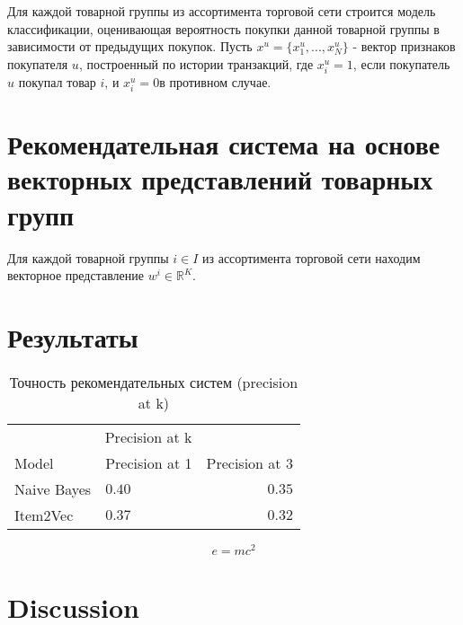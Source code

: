 \documentclass{article}
\begin{document}
Для каждой товарной группы из ассортимента торговой сети строится модель классификации, оценивающая вероятность покупки данной товарной группы в зависимости от предыдущих покупок.
Пусть $x^{u} = \{x^{u}_{1}, ..., x^{u}_{N}\}$ - вектор признаков покупателя $u$, построенный по истории транзакций, где $x^{u}_{i} = 1$, если покупатель $u$ покупал товар $i$, и $x^{u}_{i} = 0$в противном случае.


\section{Рекомендательная система на основе векторных представлений товарных групп}

Для каждой товарной группы $i \in I$ из ассортимента торговой сети находим векторное представление $w^{i} \in \mathbb{R}^{K}$.



\section{Результаты}

\begin{table}
\caption{Точность рекомендательных систем (precision at k)}
\centering
\begin{tabular}{llr}
\toprule
\multicolumn{2}{r}{Precision at k} \\
\cmidrule(r){1-3}
Model & Precision at 1 & Precision at 3 \\
\midrule
Naive Bayes & $0.40$ & $0.35$ \\
Item2Vec & $0.37$ & $0.32$ \\
\bottomrule
\end{tabular}
\end{table}

\blindtext %

\begin{equation}
\label{eq:emc}
e = mc^2
\end{equation}

\blindtext %


\section{Discussion}
\end{document}
